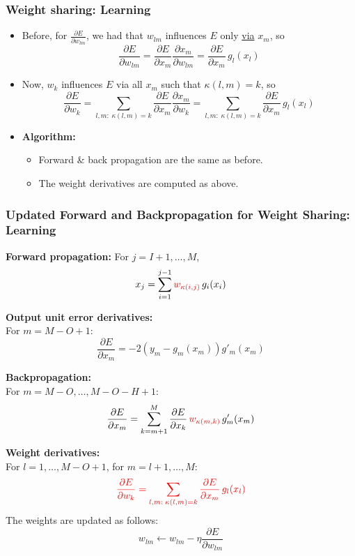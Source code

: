 \subsubsection{Weight sharing: Learning}
\begin{summary}
    \begin{itemize}
        \item Before, for \( \frac{\partial E}{\partial w_{lm}} \), we had that \( w_{lm} \) influences \( E \) only \underline{via} \( x_m \), so
        \[
        \frac{\partial E}{\partial w_{lm}} = \frac{\partial E}{\partial x_m} \frac{\partial x_m}{\partial w_{lm}} = \frac{\partial E}{\partial x_m} \, g_l(x_l)
        \]
    
        \item Now, \( w_k \) influences \( E \) via all \( x_m \) such that \( \kappa(l, m) = k \), so
        \[
        \frac{\partial E}{\partial w_k} = \sum_{l, m: \; \kappa(l, m) = k} \frac{\partial E}{\partial x_m} \frac{\partial x_m}{\partial w_k} = \sum_{l, m: \; \kappa(l, m) = k} \frac{\partial E}{\partial x_m} \, g_l(x_l)
        \]
    
        \item \textbf{Algorithm:}
        \begin{itemize}
            \item Forward \& back propagation are the same as before.
            \item The weight derivatives are computed as above.
        \end{itemize}
    \end{itemize}
\end{summary}

\subsubsection{Updated Forward and Backpropagation for Weight Sharing: Learning}
\begin{summary}
    \textbf{Forward propagation:} For \( j = I+1, \ldots, M \), 
    \[
    x_j = \sum_{i=1}^{j-1} \textcolor{red}{w_{\kappa(i,j)}} \, g_i(x_i)
    \]

    \textbf{Output unit error derivatives:} \\
    For \( m = M-O+1 \):
    \[
    \frac{\partial E}{\partial x_m} = -2(y_m - g_m(x_m)) g'_m(x_m)
    \]

    \textbf{Backpropagation:} \\
    For \( m = M-O, \ldots, M-O-H+1 \):
    \[
    \frac{\partial E}{\partial x_m} = \sum_{k=m+1}^{M} \frac{\partial E}{\partial x_k} \, \textcolor{red}{w_{\kappa(m,k)}} \, g'_m(x_m)
    \]

    \textbf{Weight derivatives:} \\
    For \( l = 1, \ldots, M-O+1 \), for \( m = l+1, \ldots, M \):
    \[
    \textcolor{red}{\frac{\partial E}{\partial w_k} = \sum_{l,m: \; \kappa(l,m)=k} \frac{\partial E}{\partial x_m} \, g_l(x_l)}
    \]
    The weights are updated as follows:
    \[
    w_{lm} \leftarrow w_{lm} - \eta \frac{\partial E}{\partial w_{lm}}
    \]
\end{summary}

